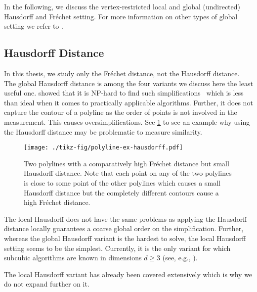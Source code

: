 In the following, we discuss the vertex-restricted local and global (undirected) Hausdorff and Fréchet setting. For more information on other types of global setting we refer to \citeauthor{global_curve_simplification}.

\subsection{Hausdorff Distance}
In this thesis, we study only the Fréchet distance, not the Hausdorff distance. The global Hausdorff distance is among the four variants we discuss here the least useful one. \citeauthor{on_optimal_polyline_simplification_using_the_hausdorff_and_frechet_distance} showed that it is NP-hard to find such simplifications~\cite{on_optimal_polyline_simplification_using_the_hausdorff_and_frechet_distance} which is less than ideal when it comes to practically applicable algorithms. Further, it does not capture the contour of a polyline as the order of points is not involved in the measurement. This causes oversimplifications. See \cref{fig:polyline-ex-hausdorff} to see an example why using the Hausdorff distance may be problematic to measure similarity.

\begin{figure}[b]
  \centering
  \texttt{[image: ./tikz-fig/polyline-ex-hausdorff.pdf]}
  \caption{Two polylines with a comparatively high Fréchet distance but small Hausdorff distance. Note that each point on any of the two polylines is close to some point of the other polylines which causes a small Hausdorff distance but the completely different contours cause a high Fréchet distance.}
  \label{fig:polyline-ex-hausdorff}
\end{figure}

The local Hausdorff does not have the same problems as applying the Hausdorff distance locally guarantees a coarse global order on the simplification. Further, whereas the global Hausdorff variant is the hardest to solve, the local Hausdorff setting seems to be the simplest. Currently, it  is the only variant for which subcubic algorithms are known in dimensions \(d \geq 3\) (see, e.g., \cite{efficiently_approximating_higher_dim}). 

The local Hausdorff variant has already been covered extensively which is why we do not expand further on it. 

